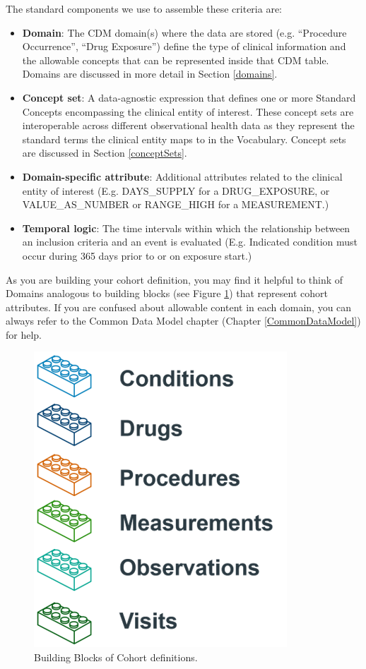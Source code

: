 \documentclass[11pt]{book}
\theoremstyle{definition}
\theoremstyle{definition}
\theoremstyle{definition}
\theoremstyle{remark}
\begin{document}
The standard components we use to assemble these criteria are:

\begin{itemize}
\item
  \textbf{Domain}: The CDM domain(s) where the data are stored (e.g.
  ``Procedure Occurrence'', ``Drug Exposure'') define the type of
  clinical information and the allowable concepts that can be
  represented inside that CDM table. Domains are discussed in more
  detail in Section \ref{domains}.
\item
  \textbf{Concept set}: A data-agnostic expression that defines one or
  more Standard Concepts encompassing the clinical entity of interest.
  These concept sets are interoperable across different observational
  health data as they represent the standard terms the clinical entity
  maps to in the Vocabulary. Concept sets are discussed in Section
  \ref{conceptSets}.
\item
  \textbf{Domain-specific attribute}: Additional attributes related to
  the clinical entity of interest (E.g. DAYS\_SUPPLY for a
  DRUG\_EXPOSURE, or VALUE\_AS\_NUMBER or RANGE\_HIGH for a
  MEASUREMENT.)
\item
  \textbf{Temporal logic}: The time intervals within which the
  relationship between an inclusion criteria and an event is evaluated
  (E.g. Indicated condition must occur during 365 days prior to or on
  exposure start.)
\end{itemize}

As you are building your cohort definition, you may find it helpful to
think of Domains analogous to building blocks (see Figure
\ref{fig:cohortLegos}) that represent cohort attributes. If you are
confused about allowable content in each domain, you can always refer to
the Common Data Model chapter (Chapter \ref{CommonDataModel}) for help.

\begin{figure}

{\centering \includegraphics[width=0.5\linewidth]{images/Cohorts/cohort-legos} 

}

\caption{Building Blocks of Cohort definitions.}\label{fig:cohortLegos}
\end{figure}
\end{document}
